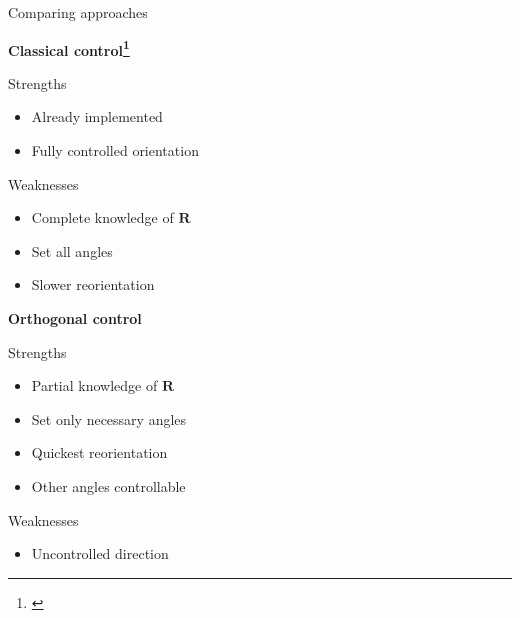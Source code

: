 \documentclass[10pt, xcolor={usenames, dvipsnames}]{beamer}
\begin{document}
        \begin{frame}{Comparing approaches}
            \begin{minipage}[t]{0.45\textwidth}
                \centering
                \textbf{\large Classical control\footnote[frame]{\textcite{jaulin2019mobile}}}
                \begin{block}{Strengths}
                    \begin{itemize}
                        \item Already implemented
                        \item Fully controlled orientation
                    \end{itemize}
                \end{block}
                \begin{block}{Weaknesses}
                    \begin{itemize}
                        \item Complete knowledge of $\mathbf{R}$
                        \item Set all angles
                        \item Slower reorientation
                    \end{itemize}
                \end{block}
            \end{minipage}
            \hfill
            \begin{minipage}[t]{0.45\textwidth}
                \centering
                \textbf{\large Orthogonal control}
                \begin{block}{Strengths}
                    \begin{itemize}
                        \item Partial knowledge of $\mathbf{R}$
                        \item Set only necessary angles
                        \item Quickest reorientation
                        \item Other angles controllable
                    \end{itemize}
                \end{block}
                \begin{block}{Weaknesses}
                    \begin{itemize}
                        \item Uncontrolled direction
                    \end{itemize}
                \end{block}
            \end{minipage}
        \end{frame}
\end{document}
